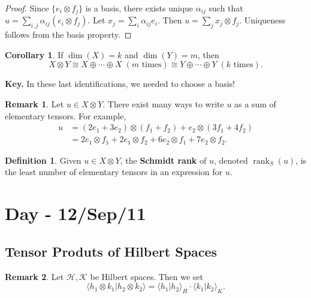 \documentclass[12pt]{article}
\theoremstyle{definition}
\newtheorem*{corollary}{Corollary}
\newtheorem*{definition}{Definition}
\newtheorem*{remark}{Remark}
\DeclareMathOperator{\rank}{rank}
\begin{document}
\begin{proof}
Since $\{e_i \otimes f_j\}$ is a basis, there exists unique $\alpha_{ij}$ such that $u = \sum_{i,j} \alpha_{ij}(e_i \otimes f_j)$. Let $x_j = \sum_i \alpha_{ij} e_i$. Then $u = \sum_j x_j \otimes f_j$. Uniqueness follows from the basis property.
\end{proof}

\begin{corollary}
If $\dim(X) = k$ and $\dim(Y) = m$, then
\[
X \otimes Y \cong X \oplus \cdots \oplus X \;(m\text{ times}) \cong Y \oplus \cdots \oplus Y \;(k\text{ times}).
\]
\end{corollary}

\textbf{Key.} In these last identifications, we needed to choose a basis!

\begin{remark}
Let $u \in X \otimes Y$. There exist many ways to write $u$ as a sum of elementary tensors. For example,
\begin{align*}
u &= (2e_1 + 3e_2) \otimes (f_1 + f_2) + e_2 \otimes (3f_1 + 4f_2) \\
&= 2e_1 \otimes f_1 + 2e_1 \otimes f_2 + 6e_2 \otimes f_1 + 7e_2 \otimes f_2.
\end{align*}
\end{remark}

\begin{definition}
Given $u \in X \otimes Y$, the \textbf{Schmidt rank} of $u$, denoted $\rank_S(u)$, is the least number of elementary tensors in an expression for $u$.
\end{definition}

\section{Day - 12/Sep/11}

\subsection{Tensor Produts of Hilbert Spaces}

\begin{remark}
Let $\mathcal{H}, \mathcal{K}$ be Hilbert spaces. Then we set
\[
\langle h_1 \otimes k_1 | h_2 \otimes k_2 \rangle = \langle h_1 | h_2 \rangle_H \cdot \langle k_1 | k_2 \rangle_K. \tag{$*$}
\]
\end{remark}
\end{document}
